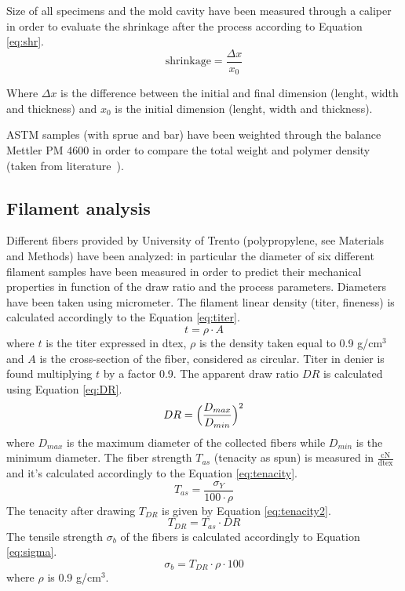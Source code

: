 \documentclass[a4paper, 11pt]{article}
\begin{document}
Size of all specimens and the mold cavity have been measured through a caliper in order to evaluate the shrinkage after the process according to Equation \ref{eq:shr}.
\begin{equation}
\text{shrinkage} = \frac{\Delta x}{x_0}
\label{eq:shr}
\end{equation}

Where $\Delta x$ is the difference between the initial and final dimension (lenght, width and thickness) and $x_0$ is the initial dimension (lenght, width and thickness). 

ASTM samples (with sprue and bar) have been weighted through the balance Mettler PM 4600 in order to compare the total weight and polymer density (taken from literature~\cite{handbook}).

\subsection{Filament analysis}

Different fibers provided by University of Trento (polypropylene, see Materials and Methods) have been analyzed: in particular the diameter of six different filament samples have been measured in order to predict their mechanical properties in function of the draw ratio and the process parameters. 
Diameters have been taken using micrometer. The filament linear density (titer, fineness) is calculated accordingly to the Equation \ref{eq:titer}. 
\begin{equation}
	t = \rho \cdot A
	\label{eq:titer}
\end{equation}
where $t$ is the titer expressed in dtex, $\rho$ is the density taken equal to 0.9 g/cm$^3$ and $A$ is the cross-section of the fiber, considered as circular. Titer in denier is found multiplying $t$ by a factor 0.9. The apparent draw ratio $DR$ is calculated using Equation \ref{eq:DR}. 
\begin{equation}
	DR = \Bigl(\frac{D_{max}}{D_{min}}\Bigr)^2
	\label{eq:DR}
\end{equation}
where $D_{max}$ is the maximum diameter of the collected fibers while $D_{min}$ is the minimum diameter. The fiber strength $T_{as}$ (tenacity as spun) is measured in $\frac{\text{cN}}{\text{dtex}}$ and it's calculated accordingly to the Equation \ref{eq:tenacity}. 
\begin{equation}
	T_{as} = \frac{\sigma_Y}{100\cdot \rho}
	\label{eq:tenacity}
\end{equation}
The tenacity after drawing $T_{DR}$ is given by Equation \ref{eq:tenacity2}. 
\begin{equation}
	T_{DR} = T_{as}\cdot DR
	\label{eq:tenacity2}
\end{equation}
The tensile strength $\sigma_b$ of the fibers is calculated accordingly to Equation \ref{eq:sigma}.
\begin{equation}
	\sigma_{b} = T_{DR}\cdot \rho \cdot 100
	\label{eq:sigma}
\end{equation}
where $\rho$ is 0.9 g/cm$^3$. 
\end{document}
